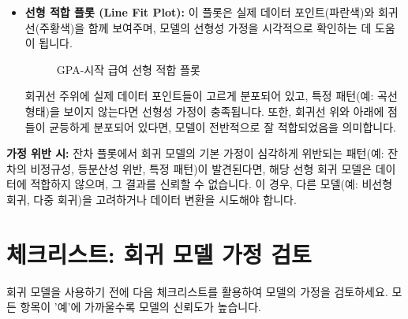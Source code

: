 \documentclass[11pt,a4paper]{book}
\theoremstyle{definition}
\begin{document}
\begin{itemize}
    \item \textbf{선형 적합 플롯 (Line Fit Plot):}
    이 플롯은 실제 데이터 포인트(파란색)와 회귀선(주황색)을 함께 보여주며, 모델의 선형성 가정을 시각적으로 확인하는 데 도움이 됩니다.
    \begin{figure}[h!]
        \centering
        \caption{GPA-시작 급여 선형 적합 플롯}
        \label{fig:gpa_salary_line_fit_plot}
    \end{figure}
    \begin{tcolorbox}[colback=lightblue,colframe=darkblue,title={선형성 가정 확인}]
    회귀선 주위에 실제 데이터 포인트들이 고르게 분포되어 있고, 특정 패턴(예: 곡선 형태)을 보이지 않는다면 선형성 가정이 충족됩니다. 또한, 회귀선 위와 아래에 점들이 균등하게 분포되어 있다면, 모델이 전반적으로 잘 적합되었음을 의미합니다.
    \end{tcolorbox}
\end{itemize}

\begin{cautionbox}
\textbf{가정 위반 시:}
잔차 플롯에서 회귀 모델의 기본 가정이 심각하게 위반되는 패턴(예: 잔차의 비정규성, 등분산성 위반, 특정 패턴)이 발견된다면, 해당 선형 회귀 모델은 데이터에 적합하지 않으며, 그 결과를 신뢰할 수 없습니다. 이 경우, 다른 모델(예: 비선형 회귀, 다중 회귀)을 고려하거나 데이터 변환을 시도해야 합니다.
\end{cautionbox}


\section{체크리스트: 회귀 모델 가정 검토}
회귀 모델을 사용하기 전에 다음 체크리스트를 활용하여 모델의 가정을 검토하세요. 모든 항목이 '예'에 가까울수록 모델의 신뢰도가 높습니다.
\end{document}

